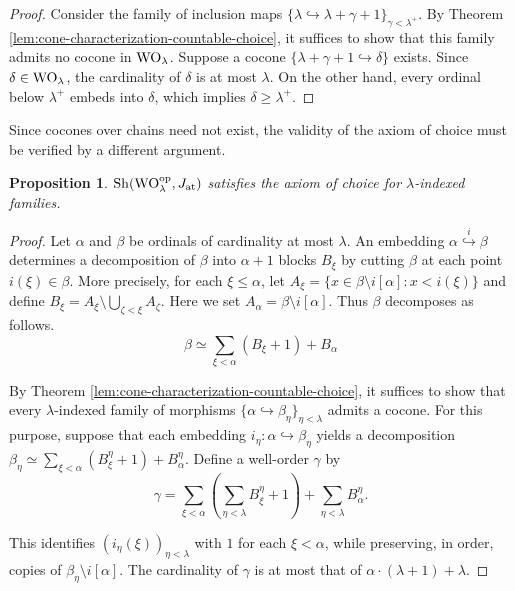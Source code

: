 \documentclass[10pt]{amsart}
\numberwithin{equation}{section}
\theoremstyle{plain}
\newtheorem{prop}[theorem]{Proposition}
\theoremstyle{definition}
\newcommand{\embed}{\hookrightarrow}
\newcommand{\embedge}[1]{\overset{#1}{\embed}}
\begin{document}
\begin{proof}
Consider the family of inclusion maps $\{\lambda\embed\lambda+\gamma+1\}_{\gamma<\lambda^+}$.
By Theorem \ref{lem:cone-characterization-countable-choice}, it suffices to show that this family admits no cocone in ${\rm WO}_\lambda$.
Suppose a cocone $\{\lambda+\gamma+1\embed\delta\}$ exists. Since $\delta\in{\rm WO}_\lambda$, the cardinality of $\delta$ is at most $\lambda$.
On the other hand, every ordinal below $\lambda^+$ embeds into $\delta$, which implies $\delta\geq\lambda^+$.
\end{proof}


Since cocones over chains need not exist, the validity of the axiom of choice must be verified by a different argument.

\begin{prop}
${\rm Sh}({\rm WO}_\lambda^{\rm op},J_{\rm at})$ satisfies the axiom of choice for $\lambda$-indexed families.
\end{prop}

\begin{proof}
Let $\alpha$ and $\beta$ be ordinals of cardinality at most $\lambda$.
An embedding $\alpha\embedge{i}\beta$ determines a decomposition of $\beta$ into $\alpha+1$ blocks $B_\xi$ by cutting $\beta$ at each point $i(\xi)\in\beta$.
More precisely, for each $\xi\leq \alpha$, let $A_\xi=\{x\in\beta\setminus i[\alpha]:x<i(\xi)\}$ and define $B_\xi=A_\xi\setminus\bigcup_{\zeta<\xi}A_\zeta$.
Here we set $A_\alpha=\beta\setminus i[\alpha]$.
Thus $\beta$ decomposes as follows.
\[
\beta\simeq\sum_{\xi<\alpha}(B_\xi+1)+B_\alpha
\]


By Theorem \ref{lem:cone-characterization-countable-choice}, it suffices to show that every $\lambda$-indexed family of morphisms $\{\alpha\embed \beta_\eta\}_{\eta<\lambda}$ admits a cocone.
For this purpose, suppose that each embedding $i_\eta\colon\alpha\embed\beta_\eta$ yields a decomposition $\beta_\eta\simeq\sum_{\xi<\alpha}(B_\xi^\eta+1)+B_\alpha^\eta$.
Define a well-order $\gamma$ by
\[
\gamma=\sum_{\xi<\alpha}\left(\sum_{\eta<\lambda}B^\eta_\xi+1\right)+\sum_{\eta<\lambda}B^\eta_\alpha.
\]


This identifies $(i_\eta(\xi))_{\eta<\lambda}$ with $1$ for each $\xi<\alpha$, while preserving, in order, copies of $\beta_\eta\setminus i[\alpha]$.
The cardinality of $\gamma$ is at most that of $\alpha\cdot(\lambda+1)+\lambda$.
\end{proof}
\end{document}
